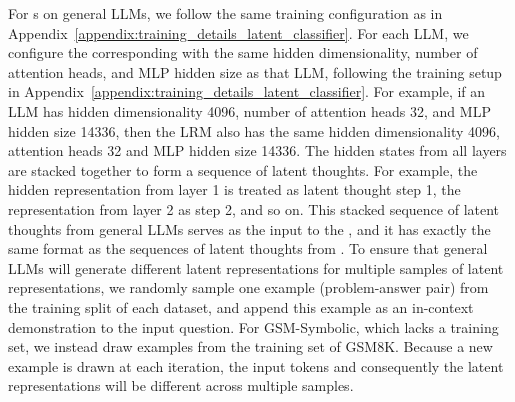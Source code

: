\documentclass{article} %
\begin{document}
For {\LRM}s on general LLMs, we follow the same training configuration as in Appendix~\ref{appendix:training_details_latent_classifier}. For each LLM, we configure the corresponding \LRM with the same hidden dimensionality, number of attention heads, and MLP hidden size as that LLM, following the training setup in Appendix~\ref{appendix:training_details_latent_classifier}. For example, if an LLM has hidden dimensionality 4096, number of attention heads 32, and MLP hidden size 14336, then the LRM also has the same hidden dimensionality 4096, attention heads 32 and MLP hidden size 14336. The hidden states from all layers are stacked together to form a sequence of latent thoughts. For example, the hidden representation from layer 1 is treated as latent thought step 1, the representation from layer 2 as step 2, and so on. This stacked sequence of latent thoughts from general LLMs serves as the input to the \LRM, and it has exactly the same format as the sequences of latent thoughts from \LRLM. To ensure that general LLMs will generate different latent representations for multiple samples of latent representations, we randomly sample one example (problem-answer pair) from the training split of each dataset, and append this example as an in-context demonstration to the input question. For GSM-Symbolic, which lacks a training set, we instead draw examples from the training set of GSM8K. Because a new example is drawn at each iteration, the input tokens and consequently the latent representations will be different across multiple samples.
\end{document}
